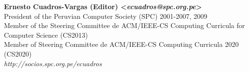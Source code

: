 \begin{center}
\textbf{Ernesto Cuadros-Vargas (Editor) <\textit{ecuadros@spc.org.pe}>}\\ 
President of the Peruvian Computer Society (SPC) 2001-2007, 2009\\
Member of the Steering Committee de ACM/IEEE-CS Computing Curricula for Computer Science (CS2013)\\
Member of Steering Committee de ACM/IEEE-CS Computing Curricula 2020 (CS2020)\\
\textit{http://socios.spc.org.pe/ecuadros}
\end{center}